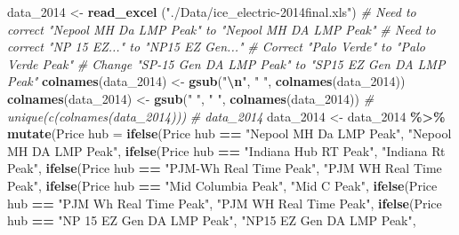 \documentclass[
]{article}
\newenvironment{Shaded}{\begin{snugshade}}{\end{snugshade}}
\newcommand{\AttributeTok}[1]{\textcolor[rgb]{0.13,0.29,0.53}{#1}}
\newcommand{\CommentTok}[1]{\textcolor[rgb]{0.56,0.35,0.01}{\textit{#1}}}
\newcommand{\FunctionTok}[1]{\textcolor[rgb]{0.13,0.29,0.53}{\textbf{#1}}}
\newcommand{\NormalTok}[1]{#1}
\newcommand{\OtherTok}[1]{\textcolor[rgb]{0.56,0.35,0.01}{#1}}
\newcommand{\SpecialCharTok}[1]{\textcolor[rgb]{0.81,0.36,0.00}{\textbf{#1}}}
\newcommand{\StringTok}[1]{\textcolor[rgb]{0.31,0.60,0.02}{#1}}
\begin{document}
\begin{Shaded}
\begin{Highlighting}[]
\NormalTok{data\_2014 }\OtherTok{\textless{}{-}} \FunctionTok{read\_excel}\NormalTok{ (}\StringTok{"./Data/ice\_electric{-}2014final.xls"}\NormalTok{)}
\CommentTok{\# Need to correct "Nepool MH Da LMP Peak" to "Nepool MH DA LMP Peak"}
\CommentTok{\# Need to correct "NP 15 EZ..." to "NP15 EZ Gen..."}
\CommentTok{\# Correct "Palo Verde" to "Palo Verde Peak"}
\CommentTok{\# Change "SP{-}15 Gen DA LMP Peak" to "SP15 EZ Gen DA LMP Peak"}
\FunctionTok{colnames}\NormalTok{(data\_2014) }\OtherTok{\textless{}{-}} \FunctionTok{gsub}\NormalTok{(}\StringTok{"}\SpecialCharTok{\textbackslash{}n}\StringTok{"}\NormalTok{, }\StringTok{" "}\NormalTok{, }\FunctionTok{colnames}\NormalTok{(data\_2014))}
\FunctionTok{colnames}\NormalTok{(data\_2014) }\OtherTok{\textless{}{-}} \FunctionTok{gsub}\NormalTok{(}\StringTok{"  "}\NormalTok{, }\StringTok{" "}\NormalTok{, }\FunctionTok{colnames}\NormalTok{(data\_2014))}
\CommentTok{\# unique(c(colnames(data\_2014)))}
\CommentTok{\# data\_2014}
\NormalTok{data\_2014 }\OtherTok{\textless{}{-}}\NormalTok{ data\_2014 }\SpecialCharTok{\%\textgreater{}\%}
  \FunctionTok{mutate}\NormalTok{(}\StringTok{\textasciigrave{}}\AttributeTok{Price hub}\StringTok{\textasciigrave{}} \OtherTok{=} 
           \FunctionTok{ifelse}\NormalTok{(}\StringTok{\textasciigrave{}}\AttributeTok{Price hub}\StringTok{\textasciigrave{}} \SpecialCharTok{==} \StringTok{"Nepool MH Da LMP Peak"}\NormalTok{, }\StringTok{"Nepool MH DA LMP Peak"}\NormalTok{,}
           \FunctionTok{ifelse}\NormalTok{(}\StringTok{\textasciigrave{}}\AttributeTok{Price hub}\StringTok{\textasciigrave{}} \SpecialCharTok{==} \StringTok{"Indiana Hub RT Peak"}\NormalTok{, }\StringTok{"Indiana Rt Peak"}\NormalTok{,}
           \FunctionTok{ifelse}\NormalTok{(}\StringTok{\textasciigrave{}}\AttributeTok{Price hub}\StringTok{\textasciigrave{}} \SpecialCharTok{==} \StringTok{"PJM{-}Wh Real Time Peak"}\NormalTok{, }\StringTok{"PJM WH Real Time Peak"}\NormalTok{,}
           \FunctionTok{ifelse}\NormalTok{(}\StringTok{\textasciigrave{}}\AttributeTok{Price hub}\StringTok{\textasciigrave{}} \SpecialCharTok{==} \StringTok{"Mid Columbia Peak"}\NormalTok{, }\StringTok{"Mid C Peak"}\NormalTok{,}
           \FunctionTok{ifelse}\NormalTok{(}\StringTok{\textasciigrave{}}\AttributeTok{Price hub}\StringTok{\textasciigrave{}} \SpecialCharTok{==} \StringTok{"PJM Wh Real Time Peak"}\NormalTok{, }\StringTok{"PJM WH Real Time Peak"}\NormalTok{,}
           \FunctionTok{ifelse}\NormalTok{(}\StringTok{\textasciigrave{}}\AttributeTok{Price hub}\StringTok{\textasciigrave{}} \SpecialCharTok{==} \StringTok{"NP 15 EZ Gen DA LMP Peak"}\NormalTok{, }\StringTok{"NP15 EZ Gen DA LMP Peak"}\NormalTok{,}

\end{Highlighting}
\end{Shaded}
\end{document}
